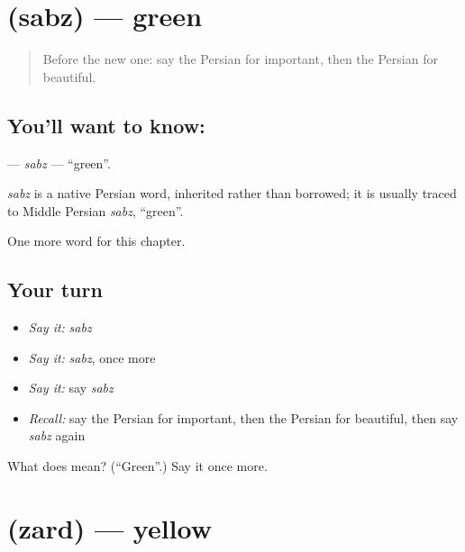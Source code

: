 \section[\texorpdfstring{\fa{سبز} (sabz)}{سبز (sabz)}]{ (sabz) — green}

\label{lesson:FA-C63-sabz}



\begin{quote}
Before the new one: say the Persian for important, then the Persian for beautiful.
\end{quote}

\subsection*{You'll want to know: }
\textbf{} — \emph{sabz} — \textquotedblleft{}green\textquotedblright{}.

\begin{cousinweb}
\emph{sabz} is a native Persian word, inherited rather than borrowed; it is usually traced to Middle Persian \emph{sabz}, \textquotedblleft{}green\textquotedblright{}.
\end{cousinweb}

\begin{grammarlens}[title={What you've built}]
One more word for this chapter.
\end{grammarlens}

\subsection*{Your turn}
\begin{itemize}
\raggedright
  \item \emph{Say it:} \emph{sabz}
  \item \emph{Say it:} \emph{sabz}, once more
  \item \emph{Say it:} say \emph{sabz}
  \item \emph{Recall:} say the Persian for important, then the Persian for beautiful, then say \emph{sabz} again
\end{itemize}

\begin{tcolorbox}[breakable,colback=teal!4,colframe=teal!35!black,title={Before you move on}]
What does  mean? (\textquotedblleft{}Green\textquotedblright{}.) Say it once more.
\end{tcolorbox}
\section[\texorpdfstring{\fa{زرد} (zard)}{زرد (zard)}]{ (zard) — yellow}

